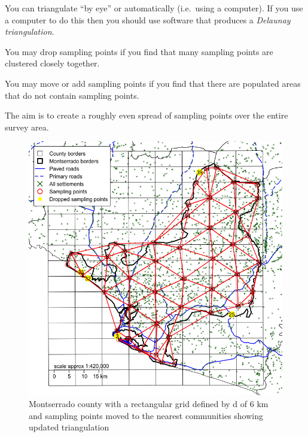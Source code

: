 \documentclass[12pt,a4paper]{book}
\theoremstyle{definition}
\theoremstyle{definition}
\theoremstyle{definition}
\theoremstyle{remark}
\begin{document}
You can triangulate ``by eye'' or automatically (i.e.~using a computer).
If you use a computer to do this then you should use software that
produces a \emph{Delaunay triangulation}.

You may drop sampling points if you find that many sampling points are
clustered closely together.

You may move or add sampling points if you find that there are populated
areas that do not contain sampling points.

The aim is to create a roughly even spread of sampling points over the
entire survey area.

\newpage

\begin{figure}[H]

{\centering \includegraphics{figures/grid3c-1} 

}

\caption{Montserrado county with a rectangular grid defined by d of 6 km and sampling points moved to the nearest communities showing updated triangulation}\label{fig:grid3c}
\end{figure}
\end{document}
